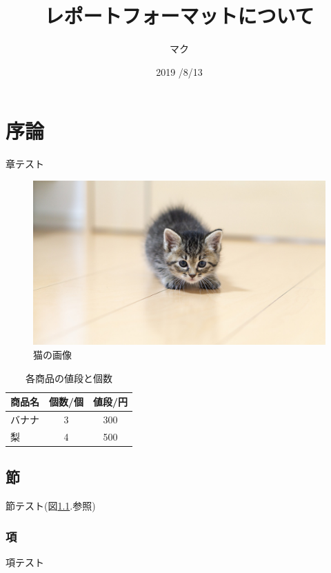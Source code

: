 \documentclass[11pt,a4j]{jreport}
\title{レポートフォーマットについて}
\author{マク}
\date{2019 /8/13}
\begin{document}
 
{\makeatletter
\let\ps@jpl@in\ps@empty
\makeatother
\pagestyle{empty}
\tableofcontents
\clearpage}

\setcounter{page}{1} %
\pagestyle{plain}
 \chapter{序論}
章テスト\cite{bunshun}

 \begin{figure}[htbp]
  \centering
  \includegraphics[width=14cm,clip]{image/TOMS526509_TP_V.jpg}
  \caption{猫の画像\cite{cat-src}}
  \label{cat}
 \end{figure}
 
 
  \begin{table}[htb]
  \begin{center}
    \caption{各商品の値段と個数}
    \begin{tabular}{lcc} \toprule
商品名 & 個数/個 & 値段/円 \\ \midrule
バナナ & 3 & 300 \\
梨 & 4 & 500 \\ \bottomrule
    \end{tabular}
    \label{shop}
  \end{center}
 \end{table}

  \section{節}
  節テスト(図\ref{cat}.参照)
  
    \subsection{項}
    項テスト
  
\end{document}
